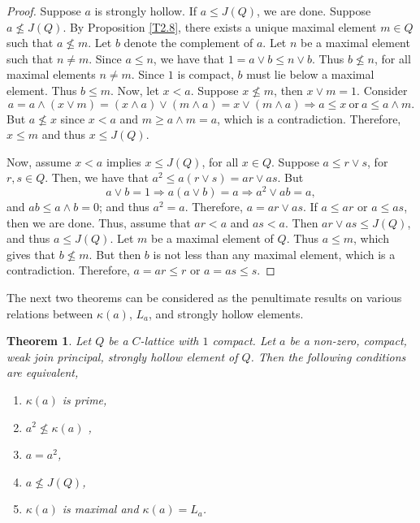 \documentclass[11pt,english]{amsart}
\newtheorem{theorem}{Theorem}[section]
\theoremstyle{definition}
\numberwithin{equation}{section}
\theoremstyle{remark}
\def\leq{\leqslant}
\begin{document}
	\begin{proof}
		Suppose $a$ is strongly hollow. If $a\leq J(Q)$, we are done. Suppose $a\nleq J(Q)$. By Proposition \ref{T2.8}, there exists a unique maximal element $m\in Q$ such that $a\nleq m$. Let $b$ denote the complement of $a$. Let $n$ be a maximal element such that $n\neq m$. Since $a\leq n$, we have that $1= a\vee b \leq n\vee b$. Thus $b\nleq n$, for all maximal elements $n\neq m$. Since $1$ is compact, $b$ must lie below a maximal element. Thus $b\leq m$. Now, let $x<a$. Suppose $x\nleq m$, then $x\vee m=1$. Consider \[a= a\wedge(x\vee m)= (x\wedge a)\vee(m\wedge a)=x\vee(m\wedge a) \Rightarrow a\leq x \: \text{or}\: a\leq a\wedge m.\]
		But $a\nleq x$ since $x<a$ and $m\geqslant a\wedge m=a$, which is a contradiction. Therefore, $x\leq m$ and thus $x\leq J(Q)$.
		
		Now, assume $x<a$ implies $ x\leq J(Q)$, for all $x\in Q$. Suppose $a\leq r\vee s$, for $r,s\in Q$. Then, we have that $a^2\leq a(r\vee s)=ar\vee as$. But  \[a\vee b =1 \Rightarrow a(a\vee b)=a \Rightarrow a^2\vee ab =a,\]
		and $ab\leq a\wedge b=0$; and thus $a^2=a$. Therefore, $a=ar\vee as$. If $a\leq ar$ or $a\leq as$, then we are done. Thus, assume that $ar<a$ and $as<a$. Then $ar\vee as\leq J(Q)$, and thus $a\leq J(Q)$. Let $m$ be a maximal element of $Q$. Thus $a\leq m$, which gives that $b\nleq m$. But then $b$ is not less than any maximal element, which is a contradiction. Therefore, $a=ar\leq r$ or $a=as\leq s$.
	\end{proof}
	
	The next two theorems can be considered as the penultimate results on various relations between $\kappa(a)$, $L_a$, and strongly hollow elements.
	
	\begin{theorem}\label{T2.25}
		Let $Q$ be a $C$-lattice with $1$ compact. Let $a$ be a non-zero, compact, weak join principal, strongly hollow element of $Q$. Then the following conditions are equivalent,
		\begin{enumerate}
			\item $\kappa(a)$ is prime,
			\item $a^2\nleq \kappa(a)$ ,
			\item $a=a^2$, 
			\item $a\nleq J(Q)$,
			\item $\kappa(a)$ is maximal and $\kappa(a)=L_a$.
		\end{enumerate}
	\end{theorem}
	
\end{document}
